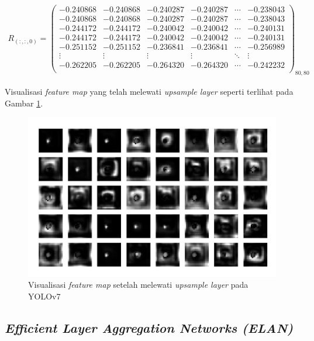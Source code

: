     \begin{align*}
        R_{(:, :, 0)} = 
        \begin{pmatrix}
            -0.240868 & -0.240868 & -0.240287 & -0.240287 & \cdots & -0.238043 \\
            -0.240868 & -0.240868 & -0.240287 & -0.240287 & \cdots & -0.238043 \\
            -0.244172 & -0.244172 & -0.240042 & -0.240042 & \cdots & -0.240131 \\
            -0.244172 & -0.244172 & -0.240042 & -0.240042 & \cdots & -0.240131 \\
            -0.251152 & -0.251152 & -0.236841 & -0.236841 & \cdots & -0.256989 \\
            \vdots    & \vdots    & \vdots    & \vdots    & \ddots & \vdots \\
            -0.262205 & -0.262205 & -0.264320 & -0.264320 & \cdots & -0.242232 \\
        \end{pmatrix}_{80, 80}
    \end{align*}

    Visualisasi \textit{feature map} yang telah melewati \textit{upsample layer} seperti terlihat pada Gambar \ref{fig:d-uplayer}.

    \begin{figure}[H]
        \begin{center}
            \includegraphics[width=12cm]{img/bab4/up-layer.png}
            \caption{Visualisasi \textit{feature map} setelah melewati \textit{upsample layer} pada YOLOv7}
            \label{fig:d-uplayer}
        \end{center}
    \end{figure}

    \subsection{\textit{Efficient Layer Aggregation Networks (ELAN)}}

